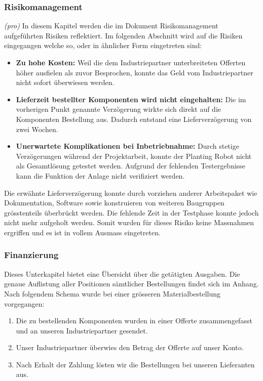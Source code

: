 \subsubsection{Risikomanagement}
\textit{(pro)} In diesem Kapitel werden die im Dokument Risikomanagement aufgeführten Risiken reflektiert. Im folgenden Abschnitt wird auf die Risiken eingegangen welche so, oder in ähnlicher Form eingetreten sind:

\begin{itemize}
	\item \textbf{Zu hohe Kosten:} Weil die dem Industriepartner unterbreiteten Offerten höher ausfielen als zuvor Besprochen, konnte das Geld vom Industriepartner nicht sofort überwiesen werden.
	\item \textbf{Lieferzeit bestellter Komponenten wird nicht eingehalten:} Die im vorherigen Punkt genannte Verzögerung wirkte sich direkt auf die Komponenten Bestellung aus. Dadurch entstand eine Lieferverzögerung von zwei Wochen.
	\item \textbf{Unerwartete Komplikationen bei Inbetriebnahme:} Durch stetige Verzögerungen während der Projektarbeit, konnte der Planting Robot nicht als Gesamtlösung getestet werden. Aufgrund der fehlenden Testergebnisse kann die Funktion der Anlage nicht verifiziert werden.
\end{itemize}

Die erwähnte Lieferverzögerung konnte durch vorziehen anderer Arbeitspaket wie Dokumentation, Software sowie konstruieren von weiteren Baugruppen grösstenteils überbrückt werden. Die fehlende Zeit in der Testphase konnte jedoch nicht mehr aufgeholt werden. Somit wurden für dieses Risiko keine Massnahmen ergriffen und es ist in vollem Ausmass eingetreten.

\subsubsection{Finanzierung} \label{finanzierung}
Dieses Unterkapitel bietet eine Übersicht über die getätigten Ausgaben. Die genaue Auflistung aller Positionen sämtlicher Bestellungen findet sich im Anhang. Nach folgendem Schema wurde bei einer grösseren Materialbestellung vorgegangen:

\begin{enumerate}
	\item Die zu bestellenden Komponenten wurden in einer Offerte zusammengefasst und an unseren Industriepartner gesendet.
	\item Unser Industriepartner überwies den Betrag der Offerte auf unser Konto.
	\item Nach Erhalt der Zahlung lösten wir die Bestellungen bei unseren Lieferanten aus.
\end{enumerate}


